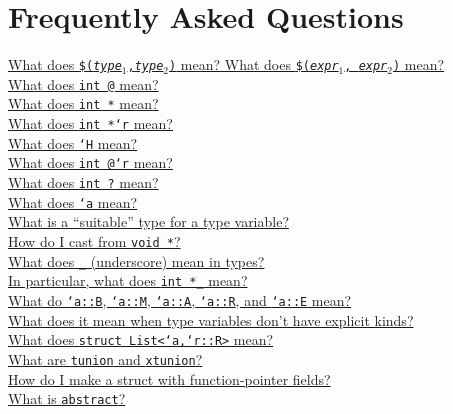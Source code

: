 \section{Frequently Asked Questions}

\newcommand{\question}[2]{\hypertarget{#1}{\paragraph{#2}}}

\ifscreen
\begin{small}
\hyperlink{faq:tuple}{What does \texttt{\$({\it type}$_1$,{\it type}$_2$)} mean?  What does \texttt{\$({\it expr}$_1$, {\it expr}$_2$)} mean?}\\
\hyperlink{faq:non-null}{What does \texttt{int @} mean?}\\
\hyperlink{faq:bounds}{What does \texttt{int *\rb} mean?}\\
\hyperlink{faq:region}{What does \texttt{int *`r} mean?}\\
\hyperlink{faq:heapregion}{What does \texttt{`H} mean?}\\
\hyperlink{faq:boundsregion}{What does \texttt{int @\rb `r} mean?}\\
\hyperlink{faq:questionable}{What does \texttt{int ?} mean?}\\
\hyperlink{faq:typevar}{What does \texttt{`a} mean?}\\
\hyperlink{faq:suitable}{What is a ``suitable'' type for a type variable?}\\
\hyperlink{faq:voidstar}{How do I cast from \texttt{void *}?}\\
\hyperlink{faq:uscore-types}{What does \texttt{_} (underscore) mean in types?}\\
\hyperlink{faq:uscore-region}{In particular, what does \texttt{int *_} mean?}\\
\hyperlink{faq:kinds}{What do \texttt{`a::B}, \texttt{`a::M}, \texttt{`a::A}, \texttt{`a::R}, and \texttt{`a::E} mean?}\\
\hyperlink{faq:nokinds}{What does it mean when type variables don't have explicit kinds?}\\
\hyperlink{faq:list}{What does \texttt{struct List<`a,`r::R>} mean?}\\
\hyperlink{faq:tagged}{What are \texttt{tunion} and \texttt{xtunion}?}\\
\hyperlink{faq:structfp}{How do I make a struct with function-pointer fields?}\\
\hyperlink{faq:abstract}{What is \texttt{abstract}?}\\

\end{small}
